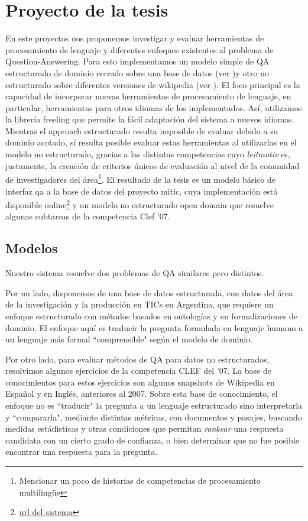 \section{Proyecto de la tesis}
\horrible
En este proyectos nos proponemos investigar y evaluar herramientas de procesamiento de lenguaje y diferentes enfoques existentes al problema
de Question-Answering. Para esto implementamos un modelo simple de QA estructurado de dominio cerrado sobre una base de datos (ver )y otro 
no estructurado sobre diferentes versiones de wikipedia (ver ). El foco principal es la capacidad de incorporar nuevas herramientas de procesamiento de lenguaje, en particular,
herramientas para otros idiomas de los implementados. Así, utilizamos la librería freeling que permite la fácil adaptación del sistema a nuevos idiomas.
Mientras el approach estructurado resulta imposible de evaluar debido a su dominio acotado, sí resulta posible evaluar estas herramientas al utilizarlas en el modelo no estructurado, gracias a las distintas competencias cuyo \textit{leitmotiv} es, justamente, la creación de criterios únicos de evaluación al nivel de la comunidad de investigadores del área\footnote{{\color{red} Mencionar un poco de historias de competencias de procesamiento multilingüe}}. El resultado de la tesis es un modelo básico de interfaz qa a la base de datos del proyecto mitic, cuya implementación está disponible online\footnote{{\color{red}\url{url del sistema}}} y un modelo no estructurado open domain que resuelve algunas subtareas de la competencia Clef '07.

\subsection{Modelos}
Nuestro sistema resuelve dos problemas de QA similares pero distintos. 

Por un lado, disponemos de una base de datos estructurada, con datos del área de la investigación y la
producción en TICs en Argentina, que requiere un enfoque estructurado con métodos basados en ontologías y en 
formalizaciones de dominio. El enfoque aquí es traducir la pregunta formulada en lenguaje humano a un lenguaje más
formal ``comprensible" según el modelo de dominio. 

Por otro lado, para evaluar métodos de QA 
para datos no estructurados, resolvimos algunos ejercicios de la competencia CLEF del '07. La base de conocimientos para
estos ejercicios son algunos snapshots de Wikipedia en Espa\~nol y en Inglés, anteriores al 2007. Sobre esta base de conocimiento,
el enfoque no es ``traducir" la pregunta a un lenguaje estructurado sino interpretarla y ``compararla", mediante distintas métricas, 
con documentos y pasajes, buscando medidas estádisticas y otras condiciones que permitan \textit{rankear} una respuesta candidata
con un cierto grado de confianza, o bien determinar que no fue posible encontrar una respuesta para la pregunta. 


